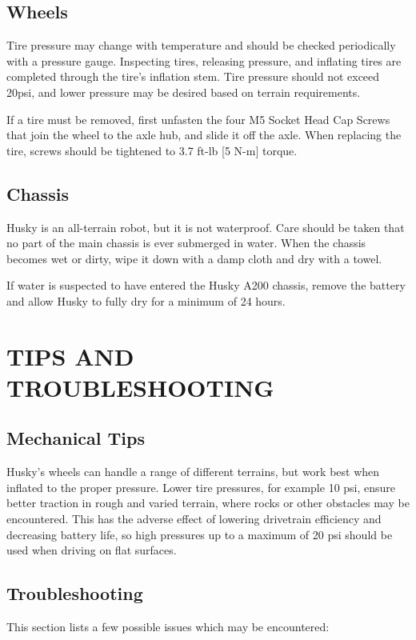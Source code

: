 \documentclass[]{clearpath-latex/clearpath-manual}
\begin{document}
\subsection{Wheels}
Tire pressure may change with temperature and should be checked periodically with a pressure gauge. 
Inspecting tires, releasing pressure, and inflating tires are completed through the tire’s inflation stem. 
Tire pressure should not exceed 20psi, and lower pressure may be desired based on terrain requirements.

If a tire must be removed, first unfasten the four M5 Socket Head Cap Screws that join the wheel to the axle hub,
and slide it off the axle. When replacing the tire, screws should be tightened to 3.7 ft-lb [5 N-m] torque.

\subsection{Chassis}
Husky is an all-terrain robot, but it is not waterproof. Care should be taken that no part of the main 
chassis is ever submerged in water. When the chassis becomes wet or dirty, wipe it down with a damp cloth 
and dry with a towel.

If water is suspected to have entered the Husky A200 chassis, remove the battery and allow Husky to fully dry for a minimum of 24 hours.

\section{TIPS AND TROUBLESHOOTING}

\subsection{Mechanical Tips}
Husky’s wheels can handle a range of different terrains, but work best when inflated to the proper pressure. 
Lower tire pressures, for example 10 psi, ensure better traction in rough and varied terrain, where rocks or 
other obstacles may be encountered. This has the adverse effect of lowering drivetrain efficiency and decreasing 
battery life, so high pressures up to a maximum of 20 psi should be used when driving on flat surfaces. 

\subsection{Troubleshooting}

This section lists a few possible issues which may be encountered:
\end{document}
